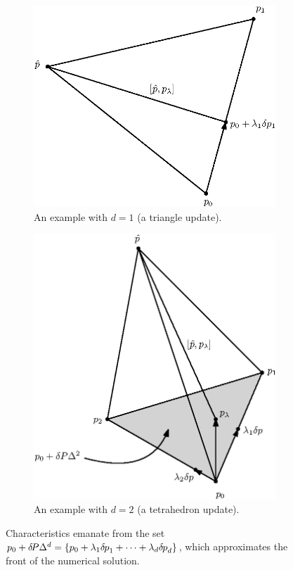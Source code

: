 \documentclass[eikonal.tex]{subfiles}
\begin{document}
\begin{figure}
  \centering
  \begin{subfigure}{.5\textwidth}
    \centering
    \includegraphics[width=\linewidth]{tri-diagram.eps}
    \caption{An example with $d = 1$ (a triangle
      update).}\label{fig:tri-diagram}
  \end{subfigure}%
  \begin{subfigure}{.5\textwidth}
    \centering
    \includegraphics[width=\linewidth]{simplex-diagram.eps}
    \caption{An example with $d = 2$ (a tetrahedron
      update).}\label{fig:tetra-diagram}
  \end{subfigure}
  \caption{Characteristics emanate from the set
    $p_0 + {\delta \hspace{-0.14em} P} \Delta^d = \left\{p_0 + \lambda_1 {\delta \hspace{-0.08em} p}_1 +
      \cdots + \lambda_d {\delta \hspace{-0.08em} p}_d\right\}$, which approximates the front of
    the numerical solution.}\label{fig:simplex-diagrams}
\end{figure}
\end{document}
